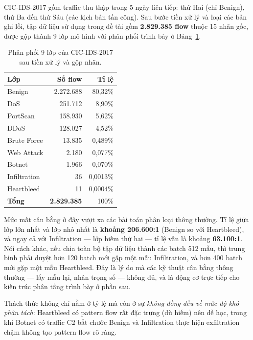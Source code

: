 \documentclass[../DoAn.tex]{subfiles}
\begin{document}
CIC-IDS-2017 \cite{sharafaldin2018} gồm traffic thu thập trong 5 ngày liên tiếp: thứ Hai (chỉ Benign), thứ Ba đến thứ Sáu (các kịch bản tấn công). Sau bước tiền xử lý và loại các bản ghi lỗi, tập dữ liệu sử dụng trong đề tài gồm \textbf{2.829.385 flow} thuộc 15 nhãn gốc, được gộp thành 9 lớp mô hình với phân phối trình bày ở Bảng~\ref{tab:cic-distribution}.

\begin{table}[H]
    \centering
    \caption{Phân phối 9 lớp của CIC-IDS-2017 sau tiền xử lý và gộp nhãn.}
    \label{tab:cic-distribution}
    \begin{tabular}{lrr}
        \hline
        \textbf{Lớp} & \textbf{Số flow} & \textbf{Tỉ lệ} \\
        \hline
        Benign       & 2.272.688 & 80,32\% \\
        DoS          &   251.712 &  8,90\% \\
        PortScan     &   158.930 &  5,62\% \\
        DDoS         &   128.027 &  4,52\% \\
        Brute Force  &    13.835 &  0,489\% \\
        Web Attack   &     2.180 &  0,077\% \\
        Botnet       &     1.966 &  0,070\% \\
        Infiltration &        36 &  0,0013\% \\
        Heartbleed   &        11 &  0,0004\% \\
        \hline
        \textbf{Tổng} & \textbf{2.829.385} & 100\% \\
        \hline
    \end{tabular}
\end{table}

Mức mất cân bằng ở đây vượt xa các bài toán phân loại thông thường. Tỉ lệ giữa lớp lớn nhất và lớp nhỏ nhất là \textbf{khoảng 206.600:1} (Benign so với Heartbleed), và ngay cả với Infiltration --- lớp hiếm thứ hai --- tỉ lệ vẫn là khoảng \textbf{63.100:1}. Nói cách khác, nếu chia toàn bộ tập dữ liệu thành các batch 512 mẫu, thì trung bình phải duyệt hơn 120 batch mới gặp một mẫu Infiltration, và hơn 400 batch mới gặp một mẫu Heartbleed. Đây là lý do mà các kỹ thuật cân bằng thông thường --- lấy mẫu lại, nhân trọng số --- không đủ, và là động cơ trực tiếp cho kiến trúc phân tầng trình bày ở phần sau.

Thách thức không chỉ nằm ở tỷ lệ mà còn ở sự \textit{không đồng đều về mức độ khó phân tách}: Heartbleed có pattern flow rất đặc trưng (dù hiếm) nên dễ học, trong khi Botnet có traffic C2 bắt chước Benign và Infiltration thực hiện exfiltration chậm không tạo pattern flow rõ ràng.
\end{document}
